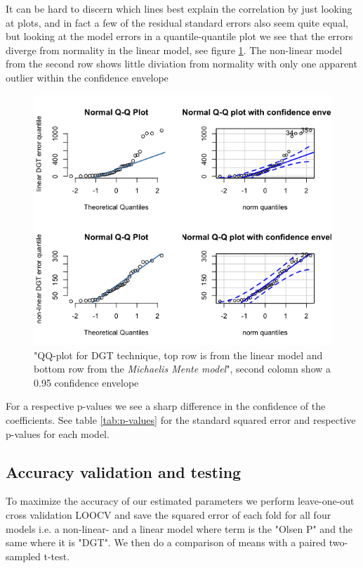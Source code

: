 \documentclass{article}
\begin{document}
It can be hard to discern which lines best explain the correlation by just looking at plots, and in fact a few of the residual standard errors also seem quite equal, but looking at the model errors in a quantile-quantile plot we see that the errors diverge from normality in the linear model, see figure \ref{fig:qqplot}. The non-linear model from the second row shows little diviation from normality with only one apparent outlier within the confidence envelope
\begin{figure}[H]
	\includegraphics[width=\linewidth]{qqplot.png}
	\caption{"QQ-plot for DGT technique, top row is from the linear model and bottom row from the \textit{Michaelis Mente model}", second colomn show a 0.95 confidence envelope}
	\label{fig:qqplot}
\end{figure}

For a  respective p-values we see a sharp difference in the confidence of the coefficients. See table \ref{tab:p-values} for the standard squared error and respective p-values for each model.


\subsection{Accuracy validation and testing}
To maximize the accuracy of our estimated parameters we perform leave-one-out cross validation LOOCV and save the squared error of each fold for all four  models i.e. a non-linear- and a linear model where term is the "Olsen P" and the same where it is "DGT". We then do a comparison of means with a paired two-sampled t-test.
\end{document}
